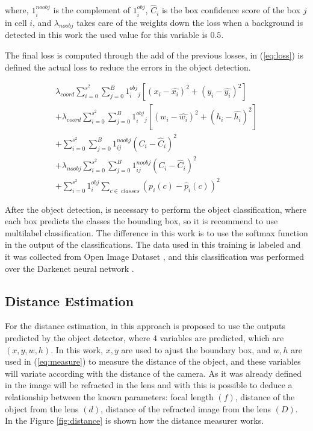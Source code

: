 where, $1^{noobj}_i$ is the complement of $1^{obj}_i$, $\hat{C}_i$ is the box confidence score of the box $j$ in cell $i$, and $\lambda_{noobj}$ takes care of the weights down the loss when a background is detected in this work the used value for this variable is $0.5$. 

The final loss is computed through the add of the previous losses, in (\ref{eq:loss}) is defined the actual loss to reduce the errors in the object detection.

\begin{equation}
\label{eq:loss}
\begin{aligned}
    \lambda_{coord}\sum_{i=0}^{s^2}\sum_{j=0}^{B}1^{obj}_i_j\left [ \left ( x_i - \hat{x_i} \right )^2  + (y_i-\hat{y_i})^2 \right ] \\ 
    + \lambda_{coord}\sum_{i=0}^{s^2}\sum_{j=0}^{B}1^{obj}_i_j\left [ \left ( w_i - \hat{w_i} \right )^2  + (h_i-\hat{h_i})^2 \right ] \\
+    \sum_{i=0}^{s^2}\sum_{j=0}^{B}1^{noobj}_{ij}\left ( C_i - \hat{C}_i \right )^2\\
+  \lambda_{noobj}\sum_{i=0}^{s^2}\sum_{j=0}^{B}1^{noobj}_{ij}\left ( C_i - \hat{C}_i \right )^2\\
+     \sum_{i=0}^{s^2}1^{obj}_i \sum_{c\in~classes} \left ( p_i\left ( c \right )-\hat{p}_i\left ( c \right )\right )^2

    \end{aligned}
\end{equation}

After the object detection, is necessary to perform the object classification, where each box predicts the classes the bounding box, so it is recommend to use multilabel classification. The difference in this work is to use the softmax function in the output of the classifications. The data used in this training is labeled and it was collected from Open Image Dataset \cite{krasin2017openimages}, and this classification was performed over the Darkenet neural network \cite{redmon2013darknet}.

\subsection{Distance Estimation}

For the distance estimation, in this approach is proposed to use the outputs predicted by the object detector, where $4$ variables are predicted, which are $(x, y, w, h)$. In this work, $x,y$ are used to ajust the boundary box, and $w, h$ are used in (\ref{eq:measure}) to measure the distance of the object, and these variables will variate according with the distance of the camera. As it was already defined in \cite{cao2013circle} the image will be refracted in the lens and with this is possible to deduce a relationship between the known parameters: focal length $(f)$, distance of the object from the lens $(d)$, distance of the refracted image from the lens $(D)$. In the Figure \ref{fig:distance} is shown how the distance measurer works. 


